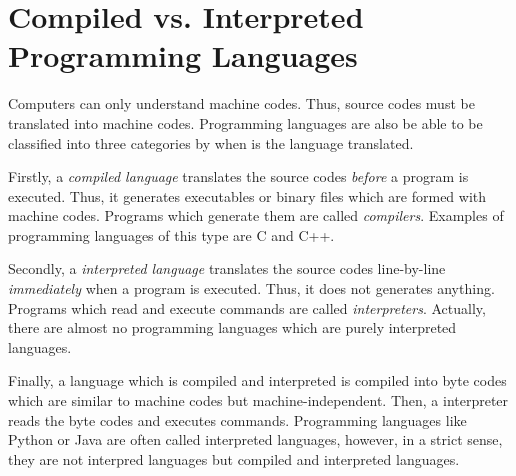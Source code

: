 \section{Compiled vs. Interpreted Programming Languages}

Computers can only understand machine codes. Thus, source codes must be
translated into machine codes. Programming languages are also be able to
be classified into three categories by when is the language translated.

Firstly, a \emph{compiled language} translates the source codes
\emph{before} a program is executed. Thus, it generates executables or
binary files which are formed with machine codes. Programs which generate
them are called \emph{compilers}. Examples of programming languages of
this type are C and C++.

Secondly, a \emph{interpreted language} translates the source codes
line-by-line \emph{immediately} when a program is executed. Thus, it does
not generates anything. Programs which read and execute commands are
called \emph{interpreters}. Actually, there are almost no programming
languages which are purely interpreted languages.

Finally, a language which is compiled and interpreted is compiled into
byte codes which are similar to machine codes but machine-independent.
Then, a interpreter reads the byte codes and executes commands.
Programming languages like Python or Java are often called interpreted
languages, however, in a strict sense, they are not interpred languages
but compiled and interpreted languages.
